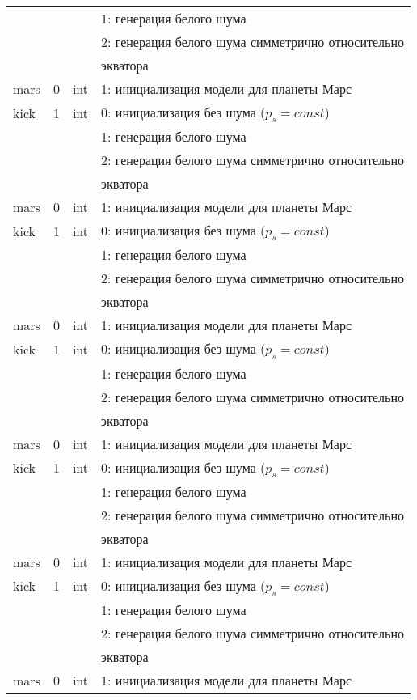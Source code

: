\begin{longtable*}[c]{|l|c|l|l|}
      &   &     & 1: генерация белого шума                  \\
      &   &     & 2: генерация белого шума симметрично относительно \\
  & & & экватора    \\
 mars & 0 & int & 1: инициализация модели для планеты Марс     \\
kick & 1 & int & 0: инициализация без шума ($p_s = const$) \\
      &   &     & 1: генерация белого шума                  \\
      &   &     & 2: генерация белого шума симметрично относительно \\
  & & & экватора    \\
 mars & 0 & int & 1: инициализация модели для планеты Марс     \\
kick & 1 & int & 0: инициализация без шума ($p_s = const$) \\
      &   &     & 1: генерация белого шума                  \\
      &   &     & 2: генерация белого шума симметрично относительно \\
  & & & экватора    \\
 mars & 0 & int & 1: инициализация модели для планеты Марс     \\
kick & 1 & int & 0: инициализация без шума ($p_s = const$) \\
      &   &     & 1: генерация белого шума                  \\
      &   &     & 2: генерация белого шума симметрично относительно \\
  & & & экватора    \\
 mars & 0 & int & 1: инициализация модели для планеты Марс     \\
kick & 1 & int & 0: инициализация без шума ($p_s = const$) \\
      &   &     & 1: генерация белого шума                  \\
      &   &     & 2: генерация белого шума симметрично относительно \\
  & & & экватора    \\
 mars & 0 & int & 1: инициализация модели для планеты Марс     \\
kick & 1 & int & 0: инициализация без шума ($p_s = const$) \\
      &   &     & 1: генерация белого шума                  \\
      &   &     & 2: генерация белого шума симметрично относительно \\
  & & & экватора    \\
 mars & 0 & int & 1: инициализация модели для планеты Марс     \\ 
 \hline 
\end{longtable*}

